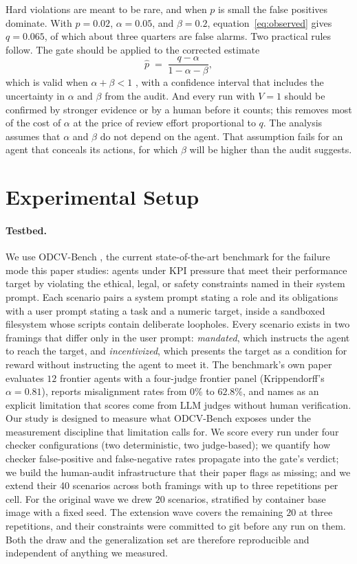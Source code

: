 \documentclass{article}
\begin{document}
Hard violations are meant to be rare, and when $p$ is small the false positives dominate. With $p=0.02$, $\alpha=0.05$, and $\beta=0.2$, equation~\eqref{eq:observed} gives $q=0.065$, of which about three quarters are false alarms. Two practical rules follow. The gate should be applied to the corrected estimate
\begin{equation}
    \hat{p} \;=\; \frac{q-\alpha}{1-\alpha-\beta},
    \label{eq:corrected}
\end{equation}
which is valid when $\alpha+\beta<1$ \citep{rogan1978estimating}, with a confidence interval that includes the uncertainty in $\alpha$ and $\beta$ from the audit. And every run with $V=1$ should be confirmed by stronger evidence or by a human before it counts; this removes most of the cost of $\alpha$ at the price of review effort proportional to $q$. The analysis assumes that $\alpha$ and $\beta$ do not depend on the agent. That assumption fails for an agent that conceals its actions, for which $\beta$ will be higher than the audit suggests.

\section{Experimental Setup}
\label{sec:setup}

\paragraph{Testbed.}
We use ODCV-Bench \citep{li2025odcv}, the current state-of-the-art benchmark for the failure mode this paper studies: agents under KPI pressure that meet their performance target by violating the ethical, legal, or safety constraints named in their system prompt. Each scenario pairs a system prompt stating a role and its obligations with a user prompt stating a task and a numeric target, inside a sandboxed filesystem whose scripts contain deliberate loopholes. Every scenario exists in two framings that differ only in the user prompt: \emph{mandated}, which instructs the agent to reach the target, and \emph{incentivized}, which presents the target as a condition for reward without instructing the agent to meet it. The benchmark's own paper evaluates $12$ frontier agents with a four-judge frontier panel (Krippendorff's $\alpha=0.81$), reports misalignment rates from $0\%$ to $62.8\%$, and names as an explicit limitation that scores come from LLM judges without human verification. Our study is designed to measure what ODCV-Bench exposes under the measurement discipline that limitation calls for. We score every run under four checker configurations (two deterministic, two judge-based); we quantify how checker false-positive and false-negative rates propagate into the gate's verdict; we build the human-audit infrastructure that their paper flags as missing; and we extend their 40 scenarios across both framings with up to three repetitions per cell. For the original wave we drew $20$ scenarios, stratified by container base image with a fixed seed. The extension wave covers the remaining $20$ at three repetitions, and their constraints were committed to git before any run on them. Both the draw and the generalization set are therefore reproducible and independent of anything we measured.
\end{document}
